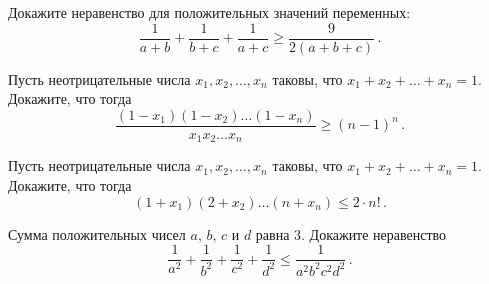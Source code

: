 \begin{problems}
\item
Докажите неравенство для положительных значений переменных:
\[
    \frac{1}{a + b} + \frac{1}{b + c} + \frac{1}{a + c}
\geq
    \frac{9}{2 (a + b + c)}
\, . \]

\item
Пусть неотрицательные числа $x_{1}, x_{2}, \ldots, x_{n}$ таковы, что
$x_{1} + x_{2} + \ldots + x_{n} = 1$.
Докажите, что тогда
\[
    \frac
        {(1 - x_{1}) (1 - x_{2}) \ldots (1 - x_{n})}
        {x_{1} x_{2} \ldots x_{n}}
\geq
    (n - 1)^{n}
\, . \]

\item
Пусть неотрицательные числа $x_{1}, x_{2}, \ldots, x_{n}$ таковы, что
$x_{1} + x_{2} + \ldots + x_{n} = 1$.
Докажите, что тогда
\[
    (1 + x_{1}) (2 + x_{2}) \ldots (n + x_{n})
\leq
    2 \cdot n!
\, . \]


\item
Сумма положительных чисел $a$, $b$, $c$ и $d$ равна $3$.
Докажите неравенство
\[
    \frac{1}{a^2} + \frac{1}{b^2} + \frac{1}{c^2} + \frac{1}{d^2}
\leq
    \frac{1}{a^2 b^2 c^2 d^2}
\, . \]

\end{problems}

